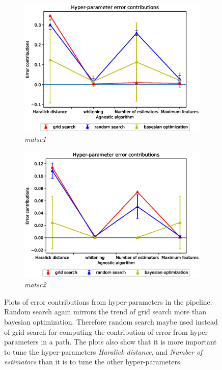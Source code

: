 \begin{figure}[ht!]
\begin{subfigure}{.5\textwidth}
  \centering
  \includegraphics[scale=0.37]{img/EP/agnostic_error_hyper_matsc_dataset1.eps}
  \caption{\textit{matsc1}}
  \label{fig:sfig3}
\end{subfigure}%
\begin{subfigure}{.5\textwidth}
  \centering
  \includegraphics[scale=0.37]{img/EP/agnostic_error_hyper_matsc_dataset2.eps}
  \caption{\textit{matsc2}}
  \label{fig:sfig4}
\end{subfigure}

\caption{Plots of error contributions from hyper-parameters in the pipeline. Random search again mirrors the trend of grid search more than bayesian optimization. Therefore random search maybe used instead of grid search for computing the contribution of error from hyper-parameters in a path. The plots also show that it is more important to tune the hyper-parameters \textit{Haralick distance}, and \textit{Number of estimators} than it is to tune  the other hyper-parameters.}
\label{fig:eq_hyper}
\end{figure}



